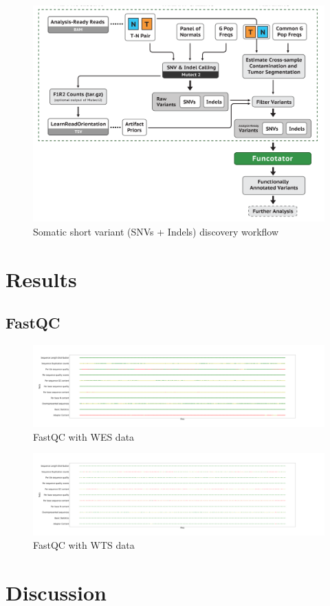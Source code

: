 \documentclass[a4paper]{article}
\begin{document}
            \begin{figure}[p]
                \centering
                \includegraphics[width=0.6 \linewidth]{figures/Workflow/somatic_short_variants.png}
                \caption{Somatic short variant (SNVs + Indels) discovery workflow \protect\cite{gatk1, gatk2}}
            \end{figure}

    \section{Results}
        \subsection{FastQC}

            \begin{figure}[p]
                \centering
                \includegraphics[width=0.8 \linewidth]{figures/FastQC/FastQC_WES.png}
                \caption{FastQC with WES data}
                \label{fig:fastqc-wes}
            \end{figure}

            \begin{figure}[p]
                \centering
                \includegraphics[width=0.8 \linewidth]{figures/FastQC/FastQC_WTS.png}
                \caption{FastQC with WTS data}
                \label{fig:fastqc-wts}
            \end{figure}

    \section{Discussion}

    
    
\end{document}
